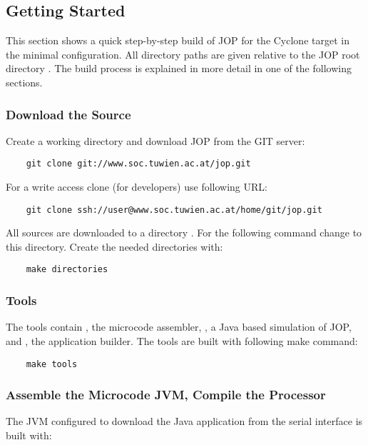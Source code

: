 \subsection{Getting Started}

\label{sec:started}

This section shows a quick step-by-step build of JOP for the Cyclone
target in the minimal configuration. All directory paths are given
relative to the JOP root directory . The build process is
explained in more detail in one of the following sections.

\subsubsection{Download the Source}

Create a working directory and download JOP from the GIT server:
\begin{lstlisting}
    git clone git://www.soc.tuwien.ac.at/jop.git
\end{lstlisting}
For a write access clone (for developers) use following URL:
\begin{lstlisting}
    git clone ssh://user@www.soc.tuwien.ac.at/home/git/jop.git
\end{lstlisting}
All sources are downloaded to a directory . For the
following command change to this directory. Create the needed
directories with:
\begin{lstlisting}
    make directories
\end{lstlisting}

\subsubsection{Tools}

The tools contain , the microcode assembler, ,
a Java based simulation of JOP, and , the application
builder. The tools are built with following make command:

\begin{lstlisting}
    make tools
\end{lstlisting}

\subsubsection{Assemble the Microcode JVM, Compile the Processor}

The JVM configured to download the Java application from the serial
interface is built with:

